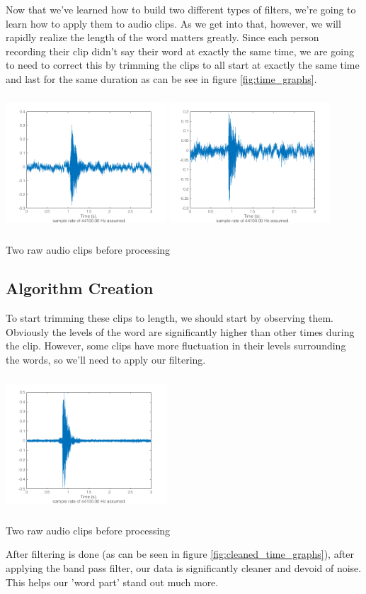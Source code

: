 \documentclass{tufte-handout}
\begin{document}
Now that we've learned how to build two different types of filters, we're going to learn how to apply them to audio clips. As we get into that, however, we will rapidly realize the length of the word matters greatly. Since each person recording their clip didn't say their word at exactly the same time, we are going to need to correct this by trimming the clips to all start at exactly the same time and last for the same duration as can be see in figure \ref{fig:time_graphs}.
\begin{marginfigure}
	\includegraphics[width = 6cm, height = 5cm]{time_1.png}
	\includegraphics[width = 6cm, height = 5cm]{time_2.png}
	\caption{Two raw audio clips before processing}
	\label{fig:time_graphs}
\end{marginfigure}

\subsection{Algorithm Creation}
To start trimming these clips to length, we should start by observing them. Obviously the levels of the word are significantly higher than other times during the clip. However, some clips have more fluctuation in their levels surrounding the words, so we'll need to apply our filtering.


\begin{marginfigure}
	\includegraphics[width = 6cm, height = 5cm]{cleaned_time_2.png}
	\caption{Two raw audio clips before processing}
	\label{fig:cleaned_time_graphs}
\end{marginfigure}
After filtering is done (as can be seen in figure \ref{fig:cleaned_time_graphs}), after applying the band pass filter, our data is significantly cleaner and devoid of noise. This helps our 'word part' stand out much more.
\end{document}
